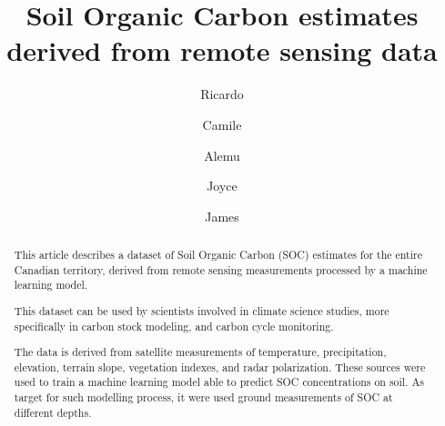 \documentclass[times,final]{elsarticle}
\begin{document}

\begin{frontmatter}

\title{Soil Organic Carbon estimates derived from remote sensing data}%

\author[1]{Ricardo }
\author[1]{Camile }
% 
\author[1]{Alemu }

\author[2]{Joyce }
\author[2]{James }

\address[1]{School of Earth, Environment \& Society, McMaster University, Hamilton, Ontario, Canada}
\address[2]{World Wildlife Fund Canada, Toronto, Ontario, Canada}



\begin{abstract}

This article describes a dataset of Soil Organic Carbon (SOC) estimates for the entire Canadian territory, derived from remote sensing measurements processed by a machine learning model. 

This dataset can be used by scientists involved in climate science studies, more specifically in carbon stock modeling, and carbon cycle monitoring. 

The data is derived from satellite measurements of temperature, precipitation, elevation, terrain slope, vegetation indexes, and radar polarization. These sources were used to train a machine learning model able to predict SOC concentrations on soil. As target for such modelling process, it were used ground measurements of SOC at different depths.


\end{abstract}
\end{frontmatter}
\end{document}

